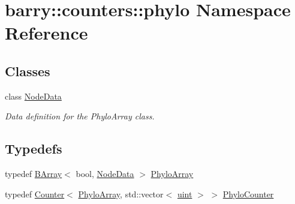 \hypertarget{namespacebarry_1_1counters_1_1phylo}{}\section{barry\+:\+:counters\+:\+:phylo Namespace Reference}
\label{namespacebarry_1_1counters_1_1phylo}
\subsection*{Classes}
\begin{DoxyCompactItemize}
\item 
class \hyperlink{classbarry_1_1counters_1_1phylo_1_1_node_data}{Node\+Data}
\begin{DoxyCompactList}\small\item\em Data definition for the {\ttfamily Phylo\+Array} class. \end{DoxyCompactList}\end{DoxyCompactItemize}
\subsection*{Typedefs}
\begin{DoxyCompactItemize}
\item 
typedef \hyperlink{classbarry_1_1_b_array}{B\+Array}$<$ bool, \hyperlink{classbarry_1_1counters_1_1phylo_1_1_node_data}{Node\+Data} $>$ \hyperlink{namespacebarry_1_1counters_1_1phylo_a50a6652c16ff57d76b4099043d6a0bbb}{Phylo\+Array}
\item 
typedef \hyperlink{classbarry_1_1_counter}{Counter}$<$ \hyperlink{namespacebarry_1_1counters_1_1phylo_a50a6652c16ff57d76b4099043d6a0bbb}{Phylo\+Array}, std\+::vector$<$ \hyperlink{namespacebarry_a11dfc53ddb4672278319aa04f1e09a6c}{uint} $>$ $>$ \hyperlink{namespacebarry_1_1counters_1_1phylo_aa4a36956c99f63ed02b7068a495bb56a}{Phylo\+Counter}
\end{DoxyCompactItemize}
